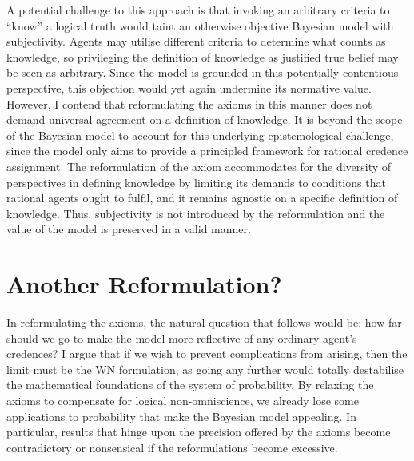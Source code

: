 \documentclass[12pt]{article}
\begin{document}
A potential challenge to this approach is that invoking an arbitrary criteria to ``know'' a logical truth would taint an otherwise objective Bayesian model with subjectivity. Agents may utilise different criteria to determine what counts as knowledge, so privileging the definition of knowledge as justified true belief may be seen as arbitrary. Since the model is grounded in this potentially contentious perspective, this objection would yet again undermine its normative value. However, I contend that reformulating the axioms in this manner does not demand universal agreement on a definition of knowledge. It is beyond the scope of the Bayesian model to account for this underlying epistemological challenge, since the model only aims to provide a principled framework for rational credence assignment. The reformulation of the axiom accommodates for the diversity of perspectives in defining knowledge by limiting its demands to conditions that rational agents ought to fulfil, and it remains agnostic on a specific definition of knowledge. Thus, subjectivity is not introduced by the reformulation and the value of the model is preserved in a valid manner.

\section{Another Reformulation?}
In reformulating the axioms, the natural question that follows would be: how far should we go to make the model more reflective of any ordinary agent's credences? I argue that if we wish to prevent complications from arising, then the limit must be the WN formulation, as going any further would totally destabilise the mathematical foundations of the system of probability. By relaxing the axioms to compensate for logical non-omniscience, we already lose some applications to probability that make the Bayesian model appealing.\autocite[436]{oup} In particular, results that hinge upon the precision offered by the axioms become contradictory or nonsensical if the reformulations become excessive.
\end{document}
